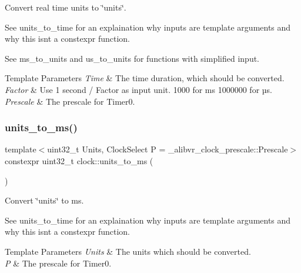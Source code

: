 Convert real time units to \char`\"{}units\char`\"{}. 

See units\+\_\+to\+\_\+time for an explaination why inputs are template arguments and why this isn\textquotesingle{}t a constexpr function.

See ms\+\_\+to\+\_\+units and us\+\_\+to\+\_\+units for functions with simplified input.


\begin{DoxyTemplParams}{Template Parameters}
{\em Time} & The time duration, which should be converted. \\
\hline
{\em Factor} & Use 1 second / Factor as input unit. 1\textquotesingle{}000 for ms 1\textquotesingle{}000\textquotesingle{}000 for µs. \\
\hline
{\em Prescale} & The prescale for {\ttfamily Timer0}. \\
\hline
\end{DoxyTemplParams}
\hypertarget{namespaceclock_a475b3551d89e7a345492a61f70830bd8}{}\label{namespaceclock_a475b3551d89e7a345492a61f70830bd8} 
\subsubsection{\texorpdfstring{units\+\_\+to\+\_\+ms()}{units\_to\_ms()}}
{\footnotesize\ttfamily template$<$uint32\+\_\+t Units, Clock\+Select P = \+\_\+alibvr\+\_\+clock\+\_\+prescale\+::\+Prescale$>$ \\
constexpr uint32\+\_\+t clock\+::units\+\_\+to\+\_\+ms (\begin{DoxyParamCaption}{ }\end{DoxyParamCaption})\hspace{0.3cm}{\ttfamily [inline]}}



Convert \char`\"{}units\char`\"{} to ms. 

See units\+\_\+to\+\_\+time for an explaination why inputs are template arguments and why this isn\textquotesingle{}t a constexpr function.


\begin{DoxyTemplParams}{Template Parameters}
{\em Units} & The units which should be converted. \\
\hline
{\em P} & The prescale for {\ttfamily Timer0}. \\
\hline
\end{DoxyTemplParams}
\hypertarget{namespaceclock_ae4ee0d04356b216b1d04046c0e1b2d38}{}\label{namespaceclock_ae4ee0d04356b216b1d04046c0e1b2d38} 
